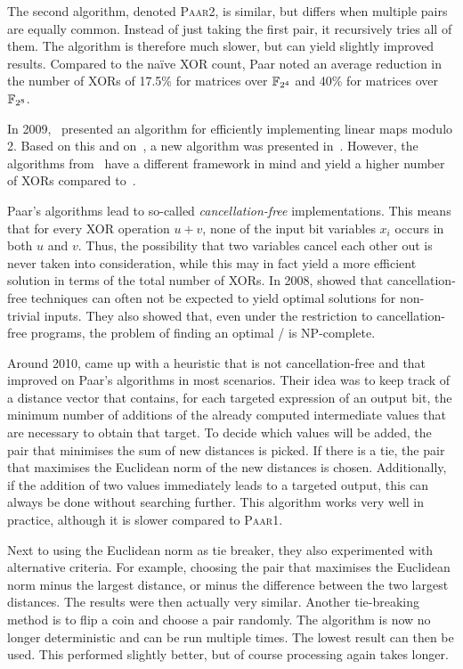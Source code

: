 The second algorithm, denoted \textsc{Paar2}, is similar, but differs when multiple pairs are equally common.
Instead of just taking the first pair, it recursively tries all of them.
The algorithm is therefore much slower, but can yield slightly improved results.
Compared to the na\"ive XOR count, Paar noted an average reduction in the number of XORs of 17.5\% for matrices over $\mathbb{F}_{2^4}$ and 40\% for matrices over $\mathbb{F}_{2^8}$.

In 2009,~\textcite{SPEEDCC:Ber09} presented an algorithm for efficiently implementing linear maps modulo 2.
Based on this and on~\cite{ISIT:Paar97}, a new algorithm was presented in~\cite{SAC:BerCho14}.
However, the algorithms from~\cite{SPEEDCC:Ber09,SAC:BerCho14} have a different framework in mind and yield a higher number of XORs compared to~\cite{ISIT:Paar97}.

Paar's algorithms lead to so-called \emph{cancellation-free} implementations. This means that for every XOR operation $u + v$, none of the input bit variables $x_i$ occurs in both $u$ and $v$.
Thus, the possibility that two variables cancel each other out is never taken into consideration, while this may in fact yield a more efficient solution in terms of the total number of XORs.
In 2008, \textcite{MFCS:BoyMatPer08} showed that cancellation-free techniques can often not be expected to yield optimal solutions for non-trivial inputs.
They also showed that, even under the restriction to cancellation-free programs, the problem of finding an optimal \SLP/ is NP-complete.

Around 2010, \textcite{SEA:BoyPer10} came up with a heuristic that is not cancellation-free and that improved on Paar's algorithms in most scenarios.
Their idea was to keep track of a distance vector that contains, for each targeted expression of an output bit, the minimum number of additions of the already computed intermediate values that are necessary to obtain that target.
To decide which values will be added, the pair that minimises the sum of new distances is picked.
If there is a tie, the pair that maximises the Euclidean norm of the new distances is chosen.
Additionally, if the addition of two values immediately leads to a targeted output, this can always be done without searching further.
This algorithm works very well in practice, although it is slower compared to \textsc{Paar1}.

Next to using the Euclidean norm as tie breaker, they also experimented with alternative criteria.
For example, choosing the pair that maximises the Euclidean norm minus the largest distance, or minus the difference between the two largest distances.
The results were then actually very similar.
Another tie-breaking method is to flip a coin and choose a pair randomly.
The algorithm is now no longer deterministic and can be run multiple times.
The lowest result can then be used.
This performed slightly better, but of course processing again takes longer.

